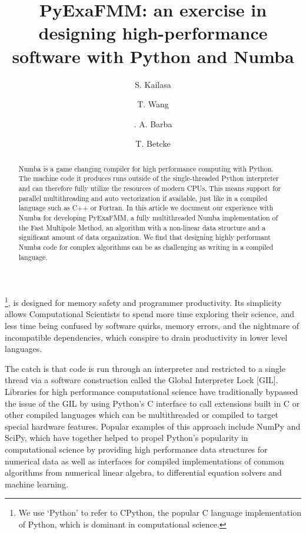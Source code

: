 \documentclass{IEEEcsmag}
\begin{document}

\title{PyExaFMM: an exercise in designing high-performance software with Python and Numba}

\author{S. Kailasa}

\author{T. Wang}

\author{. A. Barba}

\author{T. Betcke}


\begin{abstract}
    Numba is a game changing compiler for high performance computing with Python. The machine code it produces runs outside of the single-threaded Python interpreter and can therefore fully utilize the resources of modern CPUs. This means support for parallel multithreading and auto vectorization if available, just like in a compiled language such as C++ or Fortran. In this article we document our experience with Numba for developing PyExaFMM, a fully multithreaded Numba implementation of the Fast Multipole Method, an algorithm with a non-linear data structure and a significant amount of data organization. We find that designing highly performant Numba code for complex algorithms can be as challenging as writing in a compiled language.
\end{abstract}

\maketitle
{}\footnote{We use `Python' to refer to CPython, the popular C language implementation of Python, which is dominant in computational science.}, is designed for memory safety and programmer productivity. Its simplicity allows Computational Scientists to spend more time exploring their science, and less time being confused by software quirks, memory errors, and the nightmare of incompatible dependencies, which conspire to drain productivity in lower level languages.

The catch is that code is run through an interpreter and restricted to a single thread via a software construction called the Global Interpreter Lock [GIL]. Libraries for high performance computational science have traditionally bypassed the issue of the GIL by using Python's C interface to call extensions built in C or other compiled languages which can be multithreaded or compiled to target special hardware features. Popular examples of this approach include NumPy and SciPy, which have together helped to propel Python's popularity in computational science by providing high performance data structures for numerical data as well as interfaces for compiled implementations of common algorithms from numerical linear algebra, to differential equation solvers and machine learning.
\end{document}
